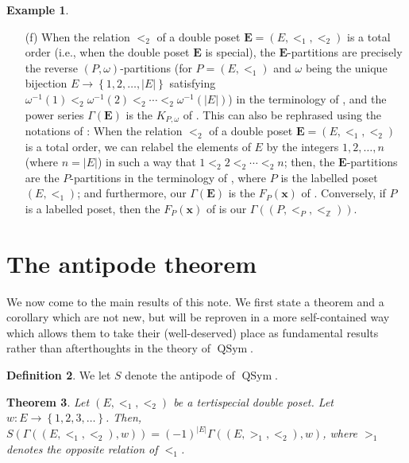 \documentclass[12pt]{article}
\theoremstyle{plain}
\newtheorem{theorem}{Theorem}
\theoremstyle{definition}
\newtheorem{definition}[theorem]{Definition}
\newtheorem{example}[theorem]{Example}
\theoremstyle{remark}
\newcommand{\xx}{{\mathbf{x}}}
\newcommand{\QSym}{{\operatorname{QSym}}}
\newcommand{\EE}{{\mathbf{E}}}
\newcommand{\ZZ}{{\mathbb{Z}}}
\begin{document}
\begin{example}
\begin{enumerate}
\item[(f)] When the relation $<_2$ of a double poset
$\EE = \left(E, <_1, <_2\right)$ is a total order (i.e.,
when the double poset $\EE$ is special), the
$\EE$-partitions are precisely the
reverse $\left(P, \omega\right)$-partitions (for
$P = \left(E, <_1\right)$ and $\omega$ being the unique
bijection $E \to \left\{1,2,\ldots,\left|E\right|\right\}$
satisfying
$\omega^{-1}\left(1\right) <_2 \omega^{-1}\left(2\right) <_2 \cdots
<_2 \omega^{-1}\left(\left|E\right|\right)$)
in the terminology
of \cite[\S 7.19]{Stanley-EC2}, and the power series
$\Gamma\left(\EE\right)$ is the $K_{P, \omega}$ of
\cite[\S 7.19]{Stanley-EC2}.
This can also be rephrased using
the notations of \cite[\S 5.2]{Reiner}: When the relation $<_2$ of a
double poset $\EE = \left(E, <_1, <_2\right)$ is a total order, we can
relabel the elements of $E$ by the integers $1, 2, \ldots, n$
(where $n = \left|E\right|$) in such
a way that $1 <_2 2 <_2 \cdots <_2 n$; then, the $\EE$-partitions are
the $P$-partitions in the terminology of \cite[Definition 5.12]{Reiner},
where $P$ is the labelled poset $\left(E, <_1\right)$; and furthermore,
our $\Gamma\left(\EE\right)$ is the $F_P\left(\xx\right)$ of
\cite[Definition 5.12]{Reiner}. Conversely, if $P$ is a labelled poset, then
the $F_P\left(\xx\right)$ of \cite[Definition 5.12]{Reiner} is our
$\Gamma\left(\left(P, <_P, <_{\ZZ}\right)\right)$.

\end{enumerate}

\end{example}

\section{The antipode theorem}
\label{sect.antipode}

We now come to the main results of this note. We first state a
theorem and a corollary which are not new, but will be reproven in
a more self-contained way which allows them to take their
(well-deserved) place as fundamental results rather than
afterthoughts in the theory of $\QSym$.

\begin{definition}
We let $S$ denote the antipode of $\QSym$.
\end{definition}

\begin{theorem}
\label{thm.antipode.Gammaw}
Let $\left(E, <_1, <_2\right)$ be a tertispecial double poset.
Let $w : E \to \left\{1, 2, 3, \ldots\right\}$. Then,
$S\left(\Gamma\left(\left(E, <_1, <_2\right), w\right)\right)
= \left(-1\right)^{\left|E\right|}
\Gamma\left(\left(E, >_1, <_2\right), w\right)$,
where $>_1$ denotes the opposite relation of $<_1$.
\end{theorem}
\end{document}
